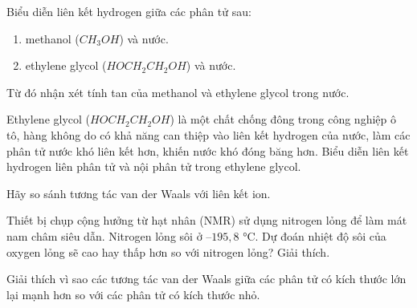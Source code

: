 \begin{bt}
	Biểu diễn liên kết hydrogen giữa các phân tử sau:
	\begin{enumerate}
		\item methanol ($CH_3OH$) và nước.
		\item ethylene glycol ($HOCH_2CH_2OH$) và nước.
	\end{enumerate}
	Từ đó nhận xét tính tan của methanol và ethylene glycol trong nước.
	\loigiai{}
\end{bt}

\begin{bt}
	Ethylene glycol ($HOCH_2CH_2OH$) là một chất chống đông trong công nghiệp ô tô, hàng không do có khả năng can thiệp vào liên kết hydrogen của nước, làm các phân tử nước khó liên kết hơn, khiến nước khó đóng băng hơn.
	Biểu diễn liên kết hydrogen liên phân tử và nội phân tử trong ethylene glycol.
	\loigiai{}
\end{bt}

\begin{bt}
	Hãy so sánh tương tác van der Waals với liên kết ion.
\end{bt}

\begin{bt}
	Thiết bị chụp cộng hưởng từ hạt nhân (NMR) sử dụng nitrogen lỏng để làm mát nam châm siêu dẫn. Nitrogen lỏng sôi ở $–195{,}8$ °C. Dự đoán nhiệt độ sôi của oxygen lỏng sẽ cao hay thấp hơn so với nitrogen lỏng? Giải thích.
\end{bt}

\begin{bt}
	Giải thích vì sao các tương tác van der Waals giữa các phân tử có kích thước lớn lại mạnh hơn so với các phân tử có kích thước nhỏ.
\end{bt}

